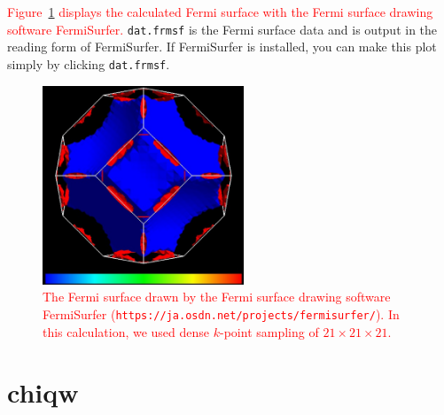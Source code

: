 \documentclass{article}
\newcommand{\tr}[1]{\textcolor{red}{#1}}
\begin{document}
\tr{Figure~\ref{frmsf-in-wannier-code} displays the calculated Fermi surface with the Fermi surface drawing software {\sc FermiSurfer}.} \verb+dat.frmsf+ is the Fermi surface data and is output in the reading form of {\sc FermiSurfer}. If {\sc FermiSurfer} is installed, you can make this plot simply by clicking \verb+dat.frmsf+.
\begin{figure}[H] 
\centering
\includegraphics[width=6cm]{Al-21x21x21-frmsf.eps}
\caption{\tr{The Fermi surface drawn by the Fermi surface drawing software {\sc FermiSurfer} ({\tt https://ja.osdn.net/projects/fermisurfer/}). In this calculation, we used dense $k$-point sampling of $21\times21\times21$.}} 
\label{frmsf-in-wannier-code}
\end{figure}

\clearpage

\section{chiqw}
\end{document}
